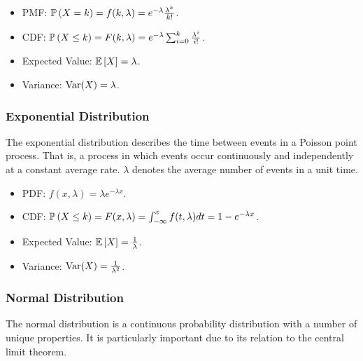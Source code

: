 \documentclass[12pt, titlepage]{article}
\begin{document}
\begin{info}{}
	\begin{itemize}
		\item PMF: $\mathbb{P}\left(X = k\right) = f(k, \lambda) = e^{-\lambda} \frac{\lambda^k}{k!}$.
		\item CDF: $\mathbb{P}\left(X \leq k\right) = F(k, \lambda) = e^{-\lambda} \sum_{i=0}^k \frac{\lambda^i}{i!}$.
		\item Expected Value: $\mathbb{E}\left[X\right] = \lambda$.
		\item Variance: $\operatorname{Var}(X) = \lambda$.
	\end{itemize}
\end{info}

\subsubsection{Exponential Distribution}

\begin{rmk}{}
	The exponential distribution describes the time between events in a Poisson point process. That is, a process in which events occur continuously and independently at a constant average rate. $\lambda$ denotes the average number of events in a unit time.
\end{rmk}

\begin{info}{}
	\begin{itemize}
		\item PDF: $f(x, \lambda) = \lambda e^{-\lambda x}$.
		\item CDF: $\mathbb{P}\left(X \leq k\right) = F(x, \lambda) = \int_{-\infty}^x f(t, \lambda) dt = 1 - e^{-\lambda x}$.
		\item Expected Value: $\mathbb{E}\left[X\right] = \frac{1}{\lambda}$.
		\item Variance: $\operatorname{Var}(X) = \frac{1}{\lambda^2}$.
	\end{itemize}
\end{info}

\subsubsection{Normal Distribution}

\begin{rmk}{}
	The normal distribution is a continuous probability distribution with a number of unique properties. It is particularly important due to its relation to the central limit theorem.
\end{rmk}
\end{document}
